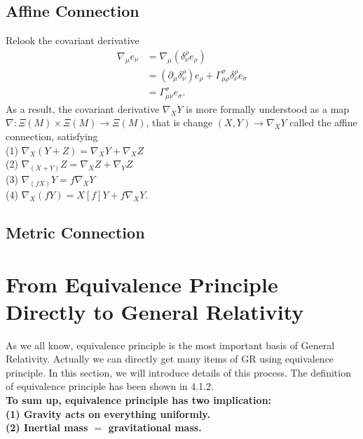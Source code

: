 \documentclass[openany,10pt]{book}
\theoremstyle{definition}
\theoremstyle{definition}
\theoremstyle{remark}
\begin{document}
\subsection{Affine Connection}
Relook the covariant derivative
\begin{equation}
    \begin{aligned}
        \nabla_\mu e_\nu&=\nabla_\mu(\delta^\rho_\nu e_\rho)\\
        &=(\partial_\mu\delta^\rho_\nu)e_\rho+\Gamma^\sigma_{\mu\rho}\delta^\rho_\nu e_\sigma\\
        &=\Gamma^\sigma_{\mu\nu}e_\sigma.
    \end{aligned}
\end{equation}
As a result, the covariant derivative $\nabla_X Y$ is more formally understood as a map $\nabla:\Xi(M)\times\Xi(M)\to\Xi(M)$, that is change $(X,Y)\to\nabla_XY$ called the affine connection, satisfying\\
(1) $\nabla_X(Y+Z)=\nabla_XY+\nabla_XZ$\\
(2) $\nabla_{(X+Y)}Z=\nabla_XZ+\nabla_YZ$\\
(3) $\nabla_{(fX)}Y=f\nabla_XY$\\
(4) $\nabla_X(fY)=X[f]Y+f\nabla_XY$.

\subsection{Metric Connection}














\section{From Equivalence Principle Directly to General Relativity}
As we all know, equivalence principle is the most important basis of General Relativity. Actually we can directly get many items of GR using equivalence principle. In this section, we will introduce details of this process. The definition of equivalence principle has been shown in 4.1.2.\\
\textbf{To sum up, equivalence principle has two implication:\\
(1) Gravity acts on everything uniformly.\\
(2) Inertial mass $=$ gravitational mass.}
\end{document}
